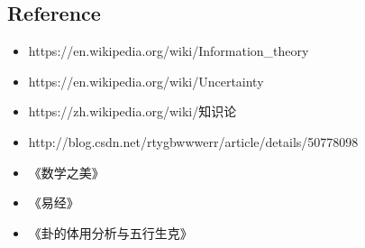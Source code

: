 \documentclass{beamer}
\begin{document}
\subsection{Reference}
\begin{frame}
  \begin{itemize}
    \item https://en.wikipedia.org/wiki/Information\_theory
    \item https://en.wikipedia.org/wiki/Uncertainty
    \item https://zh.wikipedia.org/wiki/知识论
    \item http://blog.csdn.net/rtygbwwwerr/article/details/50778098
    \item 《数学之美》
    \item 《易经》
    \item 《卦的体用分析与五行生克》
  \end{itemize}
\end{frame}
\end{document}

